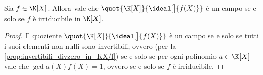 \begin{corollary}
    Sia $f \in \K[X]$. Allora vale che $\quot{\K[X]}{\ideal[\big]{f(X)}}$ è un campo se e solo se $f$ è irriducibile in $\K[X]$.
\end{corollary}
\begin{proof}
    Il quoziente $\quot{\K[X]}{\ideal[\big]{f(X)}}$ è un campo se e solo se tutti i suoi elementi non nulli sono invertibili, ovvero (per la \autoref{prop:invertibili_divzero_in_KX/f}) se e solo se per ogni polinomio $a \in \K[X]$ vale che $\gcd{a(X)}{f(X)} = 1$, ovvero se e solo se $f$ è irriducibile.
\end{proof}